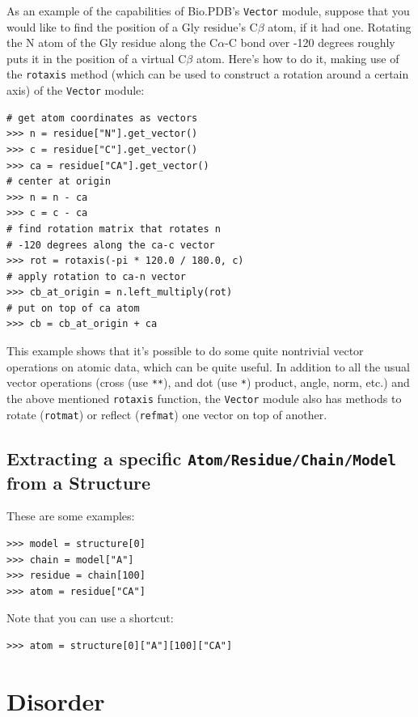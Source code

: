 As an example of the capabilities of Bio.PDB's \texttt{Vector} module,
suppose that you would like to find the position of a Gly residue's C$\beta$
atom, if it had one. Rotating the N atom of
the Gly residue along the C$\alpha$-C bond over -120 degrees roughly
puts it in the position of a virtual C$\beta$ atom. Here's how to
do it, making use of the \texttt{rotaxis} method (which can be used
to construct a rotation around a certain axis) of the \texttt{Vector}
module:

\begin{verbatim}
# get atom coordinates as vectors
>>> n = residue["N"].get_vector()
>>> c = residue["C"].get_vector()
>>> ca = residue["CA"].get_vector()
# center at origin
>>> n = n - ca
>>> c = c - ca
# find rotation matrix that rotates n
# -120 degrees along the ca-c vector
>>> rot = rotaxis(-pi * 120.0 / 180.0, c)
# apply rotation to ca-n vector
>>> cb_at_origin = n.left_multiply(rot)
# put on top of ca atom
>>> cb = cb_at_origin + ca
\end{verbatim}
This example shows that it's possible to do some quite nontrivial
vector operations on atomic data, which can be quite useful. In addition
to all the usual vector operations (cross (use \texttt{{*}{*}}), and
dot (use \texttt{{*}}) product, angle, norm, etc.) and the above mentioned
\texttt{rotaxis} function, the \texttt{Vector} module also has methods
to rotate (\texttt{rotmat}) or reflect (\texttt{refmat}) one vector
on top of another.

\subsection{Extracting a specific \texttt{Atom/\-Residue/\-Chain/\-Model}
from a Structure}

These are some examples:

\begin{verbatim}
>>> model = structure[0]
>>> chain = model["A"]
>>> residue = chain[100]
>>> atom = residue["CA"]
\end{verbatim}
Note that you can use a shortcut:

\begin{verbatim}
>>> atom = structure[0]["A"][100]["CA"]
\end{verbatim}

\section{Disorder}

